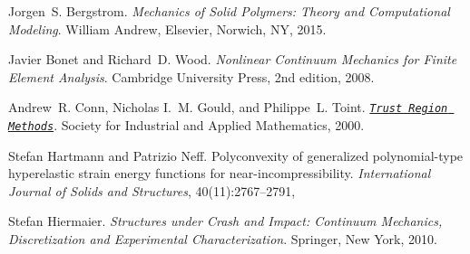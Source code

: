 
\begin{DoxyDescription}
\item[\label{a03175_CITEREF_bergstromMechanicsSolidPolymers2015}%
\Hypertarget{a03175_CITEREF_bergstromMechanicsSolidPolymers2015}%
\mbox{[}1\mbox{]}]Jorgen~S. Bergstrom. {\itshape Mechanics of Solid Polymers\+: Theory and Computational Modeling}. William Andrew, Elsevier, Norwich, NY, 2015.


\item[\label{a03175_CITEREF_bonet2008nonlinear}%
\Hypertarget{a03175_CITEREF_bonet2008nonlinear}%
\mbox{[}2\mbox{]}]Javier Bonet and Richard~D. Wood. {\itshape Nonlinear Continuum Mechanics for Finite Element Analysis}. Cambridge University Press, 2nd edition, 2008. 


\item[\label{a03175_CITEREF_trustregion}%
\Hypertarget{a03175_CITEREF_trustregion}%
\mbox{[}3\mbox{]}]Andrew~R. Conn, Nicholas I.~M. Gould, and Philippe~L. Toint. \href{https://epubs.siam.org/doi/abs/10.1137/1.9780898719857}{\texttt{ {\itshape Trust Region Methods}}}. Society for Industrial and Applied Mathematics, 2000. 


\item[\label{a03175_CITEREF_hartmann_polyconvexity_2003}%
\Hypertarget{a03175_CITEREF_hartmann_polyconvexity_2003}%
\mbox{[}4\mbox{]}]Stefan Hartmann and Patrizio Neff. Polyconvexity of generalized polynomial-\/type hyperelastic strain energy functions for near-\/incompressibility. {\itshape International Journal of Solids and Structures}, 40(11)\+:2767--2791,
\begin{DoxyEnumerate}
\item 
\end{DoxyEnumerate}


\item[\label{a03175_CITEREF_hiermaierStructuresCrashImpact2010}%
\Hypertarget{a03175_CITEREF_hiermaierStructuresCrashImpact2010}%
\mbox{[}5\mbox{]}]Stefan Hiermaier. {\itshape Structures under Crash and Impact\+: Continuum Mechanics, Discretization and Experimental Characterization}. Springer, New York, 2010.


\end{DoxyDescription}